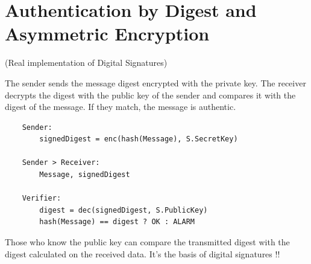 \section{Authentication by Digest and Asymmetric Encryption}
\begin{center}
    (Real implementation of Digital Signatures)
\end{center}
The sender sends the message digest encrypted with the private key. The receiver decrypts the digest with the public key of the sender and compares it with the digest of the message. If they match, the message is authentic.
\begin{verbatim}
    Sender: 
        signedDigest = enc(hash(Message), S.SecretKey)

    Sender > Receiver:
        Message, signedDigest 

    Verifier:
        digest = dec(signedDigest, S.PublicKey)
        hash(Message) == digest ? OK : ALARM
\end{verbatim}

Those who know the public key can compare the transmitted digest with the digest calculated on the received data. It's the basis of digital signatures !! 


\clearpage

